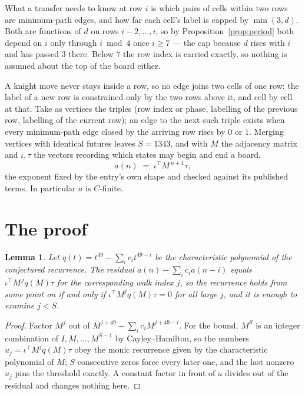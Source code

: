 \documentclass[11pt,a4paper]{article}
\theoremstyle{plain}
\newtheorem{lemma}[theorem]{Lemma}
\theoremstyle{definition}
\begin{document}
What a transfer needs to know at row $i$ is which pairs of cells within two rows are minimum-path edges, and how far each cell's label is capped by $\min(3,d)$. Both are functions of $d$ on rows $i-2,\dots,i$, so by Proposition~\ref{prop:period} both depend on $i$ only through $i\bmod 4$ once $i\ge7$ --- the cap because $d$ rises with $i$ and has passed $3$ there. Below $7$ the row index is carried exactly, so nothing is assumed about the top of the board either.

A knight move never stays inside a row, so no edge joins two cells of one row: the label of a new row is constrained only by the two rows above it, and cell by cell at that. Take as vertices the triples (row index or phase, labelling of the previous row, labelling of the current row); an edge to the next such triple exists when every minimum-path edge closed by the arriving row rises by $0$ or $1$. Merging vertices with identical futures leaves $S=1343$, and with $M$ the adjacency matrix and $\iota,\tau$ the vectors recording which states may begin and end a board,
\[
a(n)\;=\;\iota^{\!\top}M^{\,n+1}\tau ,
\]
the exponent fixed by the entry's own shape and checked against its published terms. In
particular $a$ is $C$-finite.

\section{The proof}

\begin{lemma}\label{lem:crit}
Let $q(t)=t^{49}-\sum_i c_it^{49-i}$ be the characteristic polynomial of the
conjectured recurrence. The residual $a(n)-\sum_ic_ia(n-i)$ equals
$\iota^{\!\top}M^{\,j}q(M)\tau$ for the corresponding walk index $j$, so the recurrence
holds from some point on if and only if $\iota^{\!\top}M^{j}q(M)\tau=0$ for all large $j$,
and it is enough to examine $j<S$.
\end{lemma}

\begin{proof}
Factor $M^{j}$ out of $M^{j+49}-\sum_ic_iM^{j+49-i}$. For the bound, $M^{S}$
is an integer combination of $I,M,\dots,M^{S-1}$ by Cayley--Hamilton, so the numbers
$u_j=\iota^{\!\top}M^{j}q(M)\tau$ obey the monic recurrence given by the characteristic
polynomial of $M$; $S$ consecutive zeros force every later one, and the last nonzero $u_j$
pins the threshold exactly. A constant factor in front of $a$ divides out of the residual and
changes nothing here.
\end{proof}
\end{document}

